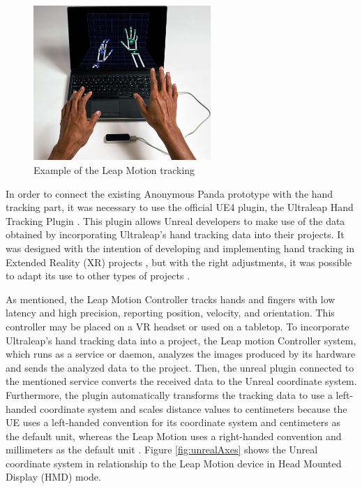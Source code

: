 \begin{figure}[!htb]
\includegraphics[width=0.6\textwidth]{figures/leapMotion.jpg}
\centering
\caption{Example of the Leap Motion tracking}
\label{fig:exampleLeap}
\end{figure}

In order to connect the existing Anonymous Panda prototype with the hand tracking part, it was necessary to use the official UE4 plugin, the Ultraleap Hand Tracking Plugin \cite{ULT}. This plugin allows Unreal developers to make use of the data obtained by incorporating Ultraleap's hand tracking data into their projects. It was designed with the intention of developing and implementing hand tracking in Extended Reality (XR) projects \cite{XR}, but with the right adjustments, it was possible to adapt its use to other types of projects \cite{ULTG}.

As mentioned, the Leap Motion Controller tracks hands and fingers with low latency and high precision, reporting position, velocity, and orientation. This controller may be placed on a VR headset or used on a tabletop. To incorporate Ultraleap's hand tracking data into a project, the Leap motion Controller system, which runs as a service or daemon, analyzes the images produced by its hardware and sends the analyzed data to the project. Then, the unreal plugin connected to the mentioned service converts the received data to the Unreal coordinate system. Furthermore, the plugin automatically transforms the tracking data to use a left-handed coordinate system and scales distance values to centimeters because the UE uses a left-handed convention for its coordinate system and centimeters as the default unit, whereas the Leap Motion uses a right-handed convention and millimeters as the default unit \cite{ULTP}. Figure \ref{fig:unrealAxes} shows the Unreal coordinate system in relationship to the Leap Motion device in Head Mounted Display (HMD) mode.

